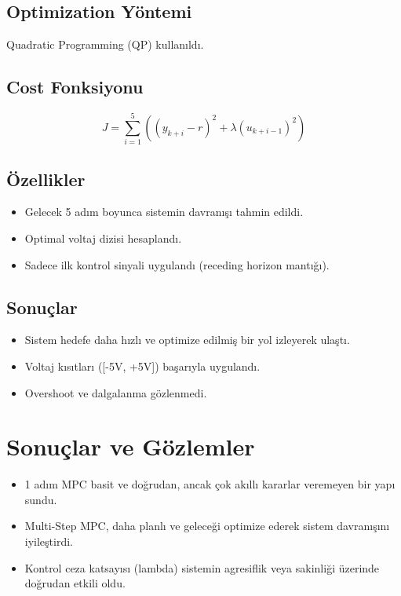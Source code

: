 \documentclass[12pt,a4paper]{article}
\begin{document}
\subsection{Optimization Yöntemi}
Quadratic Programming (QP) kullanıldı.

\subsection{Cost Fonksiyonu}
\begin{equation}
J = \sum_{i=1}^{5} \left( (y_{k+i} - r)^2 + \lambda (u_{k+i-1})^2 \right)
\end{equation}

\subsection{Özellikler}
\begin{itemize}
\item Gelecek 5 adım boyunca sistemin davranışı tahmin edildi.
\item Optimal voltaj dizisi hesaplandı.
\item Sadece ilk kontrol sinyali uygulandı (receding horizon mantığı).
\end{itemize}

\subsection{Sonuçlar}
\begin{itemize}
\item Sistem hedefe daha hızlı ve optimize edilmiş bir yol izleyerek ulaştı.
\item Voltaj kısıtları ([-5V, +5V]) başarıyla uygulandı.
\item Overshoot ve dalgalanma gözlenmedi.
\end{itemize}

\section{Sonuçlar ve Gözlemler}
\begin{itemize}
\item 1 adım MPC basit ve doğrudan, ancak çok akıllı kararlar veremeyen bir yapı sundu.
\item Multi-Step MPC, daha planlı ve geleceği optimize ederek sistem davranışını iyileştirdi.
\item Kontrol ceza katsayısı (lambda) sistemin agresiflik veya sakinliği üzerinde doğrudan etkili oldu.
\end{itemize}
\end{document}

